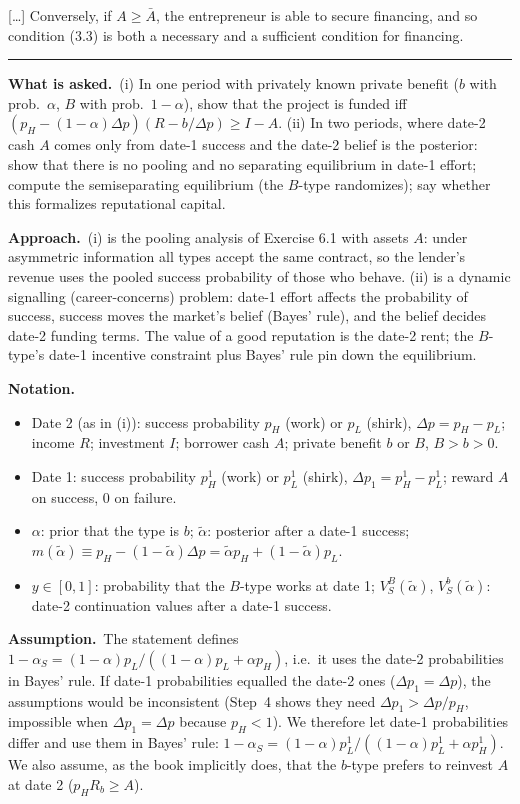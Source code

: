 \documentclass[11pt,a4paper]{article}
\newcommand{\notation}{\par\noindent\textbf{Notation.}}
\newcommand{\assume}{\par\smallskip\noindent\textbf{Assumption.}~}
\newcommand{\asked}{\par\medskip\noindent\textbf{What is asked.}~}
\newcommand{\approach}{\par\smallskip\noindent\textbf{Approach.}~}
\newcommand{\stmtend}{\par\endgroup\nopagebreak\noindent\rule{\linewidth}{0.4pt}\par\medskip}
\begin{document}
{[}\ldots{]} Conversely, if \(A \geqslant \bar{A}\), the entrepreneur is able to secure financing,
and so condition (3.3) is both a necessary and a sufficient condition for financing.
\stmtend

\asked (i) In one period with privately known private benefit ($b$ with prob.\ $\alpha$, $B$ with prob.\ $1-\alpha$), show that the project is funded iff $(p_H-(1-\alpha)\Delta p)(R-b/\Delta p)\ge I-A$. (ii) In two periods, where date-2 cash $A$ comes only from date-1 success and the date-2 belief is the posterior: show that there is no pooling and no separating equilibrium in date-1 effort; compute the semiseparating equilibrium (the $B$-type randomizes); say whether this formalizes reputational capital.

\approach (i) is the pooling analysis of Exercise 6.1 with assets $A$: under asymmetric information all types accept the same contract, so the lender's revenue uses the pooled success probability of those who behave. (ii) is a dynamic signalling (career-concerns) problem: date-1 effort affects the probability of success, success moves the market's belief (Bayes' rule), and the belief decides date-2 funding terms. The value of a good reputation is the date-2 rent; the $B$-type's date-1 incentive constraint plus Bayes' rule pin down the equilibrium.

\notation
\begin{itemize}
  \item Date 2 (as in (i)): success probability $p_H$ (work) or $p_L$ (shirk), $\Delta p=p_H-p_L$; income $R$; investment $I$; borrower cash $A$; private benefit $b$ or $B$, $B>b>0$.
  \item Date 1: success probability $p^1_H$ (work) or $p^1_L$ (shirk), $\Delta p_1=p^1_H-p^1_L$; reward $A$ on success, 0 on failure.
  \item $\alpha$: prior that the type is $b$; $\tilde\alpha$: posterior after a date-1 success; $m(\tilde\alpha)\equiv p_H-(1-\tilde\alpha)\Delta p=\tilde\alpha p_H+(1-\tilde\alpha)p_L$.
  \item $y\in[0,1]$: probability that the $B$-type works at date 1; $V^B_S(\tilde\alpha)$, $V^b_S(\tilde\alpha)$: date-2 continuation values after a date-1 success.
\end{itemize}

\assume The statement defines $1-\alpha_S=(1-\alpha)p_L/((1-\alpha)p_L+\alpha p_H)$, i.e.\ it uses the date-2 probabilities in Bayes' rule. If date-1 probabilities equalled the date-2 ones ($\Delta p_1=\Delta p$), the assumptions would be inconsistent (Step~4 shows they need $\Delta p_1>\Delta p/p_H$, impossible when $\Delta p_1=\Delta p$ because $p_H<1$). We therefore let date-1 probabilities differ and use them in Bayes' rule: $1-\alpha_S=(1-\alpha)p^1_L/((1-\alpha)p^1_L+\alpha p^1_H)$. We also assume, as the book implicitly does, that the $b$-type prefers to reinvest $A$ at date 2 ($p_HR_b\ge A$).
\end{document}
